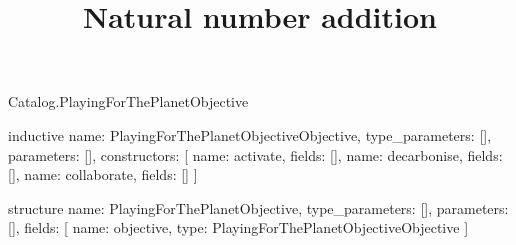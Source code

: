 \begin{lexlean}{Catalog.PlayingForThePlanetObjective}
\title{Natural number addition}
\begin{semanticmodule}
inductive{
  name: PlayingForThePlanetObjectiveObjective,
  type_parameters: [],
  parameters: [],
  constructors: [
    {name: activate, fields: []},
    {name: decarbonise, fields: []},
    {name: collaborate, fields: []}
  ]
}

structure{
  name: PlayingForThePlanetObjective,
  type_parameters: [],
  parameters: [],
  fields: [
    {name: objective, type: PlayingForThePlanetObjectiveObjective}
  ]
}
\end{semanticmodule}
\end{lexlean}
